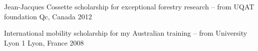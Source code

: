 \begin{cvhonors}
  \cvhonor
    {\normalsize Jean-Jacques Cossette scholarship}
    {for exceptional forestry research – from UQAT foundation}
    {Qc, Canada}
    {\normalsize 2012}
 \end{cvhonors}

 
\begin{cvhonors}

    \cvhonor
    {\normalsize International mobility scholarship}
    {for my Australian training – from University Lyon 1}
    {Lyon, France}
    {\normalsize 2008}

\end{cvhonors}
